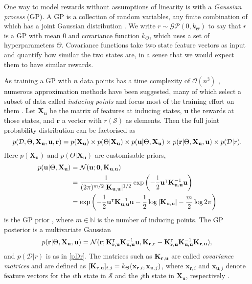\documentclass{mprop}
\theoremstyle{definition}
\begin{document}
One way to model rewards without assumptions of linearity is with a
\emph{Gaussian process} (GP). A GP is a collection of random variables, any
finite combination of which has a joint Gaussian distribution
\cite{DBLP:books/lib/RasmussenW06}. We write $r \sim \mathcal{GP}(0,
k_{\Theta})$ to say that $r$ is a GP with mean $0$ and covariance function
$k_{\Theta}$, which uses a set of hyperparameters $\Theta$. Covariance functions
take two state feature vectors as input and quantify how similar the two states
are, in a sense that we would expect them to have similar rewards.

As training a GP with $n$ data points has a time complexity of
$\mathcal{O}(n^3)$ \cite{DBLP:books/lib/RasmussenW06}, numerous approximation
methods have been suggested, many of which select a subset of data called
\emph{inducing points} and focus most of the training effort on them
\cite{DBLP:journals/corr/abs-1807-01065}. Let $\mathbf{X_u}$ be the matrix of
features at inducing states, $\mathbf{u}$ the rewards at those states, and
$\mathbf{r}$ a vector with $r(\mathcal{S})$ as elements. Then the full joint
probability distribution can be factorised as
\begin{equation} \label{full}
  p(\mathcal{D}, \Theta, \mathbf{X_u}, \mathbf{u}, \mathbf{r}) = p(\mathbf{X_u}) \times p(\Theta | \mathbf{X_u}) \times p(\mathbf{u}
  | \Theta, \mathbf{X_u}) \times p(\mathbf{r} | \Theta, \mathbf{X_u},
  \mathbf{u}) \times p(\mathcal{D} | r).
\end{equation}
Here $p(\mathbf{X_u})$ and $p(\Theta | \mathbf{X_u})$ are customisable priors,
\begin{align}
  p(\mathbf{u} | \Theta, \mathbf{X_u}) &= \mathcal{N}(\mathbf{u}; \mathbf{0}, \mathbf{K}_{\mathbf{u},\mathbf{u}}) \nonumber \\
                                       &= \frac{1}{(2\pi)^{m/2}|\mathbf{K}_{\mathbf{u},\mathbf{u}}|^{1/2}}\exp \left( -\frac{1}{2} \mathbf{u}^\intercal\mathbf{K}_{\mathbf{u},\mathbf{u}}^{-1}\mathbf{u} \right) \nonumber \\
                                       &= \exp\left(-\frac{1}{2}\mathbf{u}^\intercal\mathbf{K}_{\mathbf{u},\mathbf{u}}^{-1}\mathbf{u} - \frac{1}{2}\log|\mathbf{K}_{\mathbf{u},\mathbf{u}}| - \frac{m}{2}\log 2\pi\right) \label{eq:normal}
\end{align}
is the GP prior \cite{DBLP:books/lib/RasmussenW06}, where $m \in \mathbb{N}$ is
the number of inducing points. The GP posterior is a
multivariate Gaussian \cite{DBLP:conf/nips/LevinePK11}
\begin{equation} \label{eq:r}
  p(\mathbf{r} | \Theta, \mathbf{X_u}, \mathbf{u}) =
  \mathcal{N}(\mathbf{r}; \mathbf{K}_{\mathbf{r},\mathbf{u}}^\intercal\mathbf{K}_{\mathbf{u},\mathbf{u}}^{-1}\mathbf{u}, \mathbf{K}_{\mathbf{r},\mathbf{r}} - \mathbf{K}_{\mathbf{r},\mathbf{u}}^\intercal\mathbf{K}_{\mathbf{u},\mathbf{u}}^{-1}\mathbf{K}_{\mathbf{r},\mathbf{u}}),
\end{equation}
and $p(\mathcal{D} | r)$ is as in \eqref{pDr}. The matrices such as
$\mathbf{K}_{\mathbf{r},\mathbf{u}}$ are called \emph{covariance matrices} and are defined as
$[\mathbf{K}_{\mathbf{r},\mathbf{u}}]_{i,j} = k_\Theta(\mathbf{x}_{\mathbf{r},i}, \mathbf{x}_{\mathbf{u},j})$,
where $\mathbf{x}_{\mathbf{r},i}$ and $\mathbf{x}_{\mathbf{u},j}$ denote feature
vectors for the $i$th state in $\mathcal{S}$ and the $j$th state in
$\mathbf{X_u}$, respectively \cite{DBLP:conf/uai/JinDAS17}.
\end{document}
